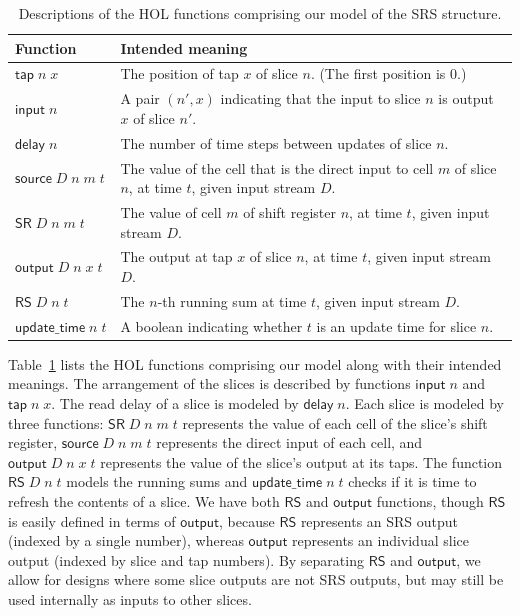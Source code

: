 \documentclass{llncs}
\begin{document}
\begin{table}[t]
\begin{tabular}{lp{}}
Function&Intended meaning\\
\hline
\(\mathsf{tap}\;n\;x\)&The position of tap $x$ of slice $n$. (The first position is $0$.)\\
\(\mathsf{input}\;n\)&A pair $(n',x)$ indicating that the input to slice $n$ is output $x$ of slice $n'$.\\
\(\mathsf{delay}\;n\)&The number of time steps between updates of slice $n$.\\
\(\mathsf{source}\;D\;n\;m\;t\)&The value of the cell that is the direct input to cell $m$ of slice $n$, at time $t$, given input stream $D$.\\
\(\mathsf{SR}\;D\;n\;m\;t\)&The value of cell $m$ of shift register $n$, at time $t$, given input stream $D$.\\
\(\mathsf{output}\;D\;n\;x\;t\)&The output at tap $x$ of slice $n$, at time $t$, given input stream $D$.\\
\(\mathsf{RS}\;D\;n\;t\)&The $n$-th running sum at time $t$, given input stream $D$.\\
\(\mathsf{update\_time}\;n\;t\)&A boolean indicating whether $t$ is an update time for slice $n$.
\end{tabular}
\vspace{2ex}
\caption{
Descriptions of the HOL functions comprising our model of the SRS structure.
\label{tab:descriptions}
}
\end{table}

Table~\ref{tab:descriptions} lists the HOL functions comprising our model along with their intended meanings.
The arrangement of the slices is described by functions $\mathsf{input}\;n$ and $\mathsf{tap}\;n\;x$.
The read delay of a slice is modeled by $\mathsf{delay}\;n$.
Each slice is modeled by three functions: $\mathsf{SR}\;D\;n\;m\;t$ represents the value of each cell of the slice's shift register, $\mathsf{source}\;D\;n\;m\;t$ represents the direct input of each cell, and $\mathsf{output}\;D\;n\;x\;t$ represents the value of the slice's output at its taps.
The function $\mathsf{RS}\;D\;n\;t$ models the running sums and $\mathsf{update\_time}\;n\;t$ checks if it is time to refresh the contents of a slice.
We have both $\mathsf{RS}$ and $\mathsf{output}$ functions, though $\mathsf{RS}$ is easily defined in terms of $\mathsf{output}$, because $\mathsf{RS}$ represents an SRS output (indexed by a single number), whereas $\mathsf{output}$ represents an individual slice output (indexed by slice and tap numbers).
By separating $\mathsf{RS}$ and $\mathsf{output}$, we allow for designs where some slice outputs are not SRS outputs, but may still be used internally as inputs to other slices.
\end{document}
